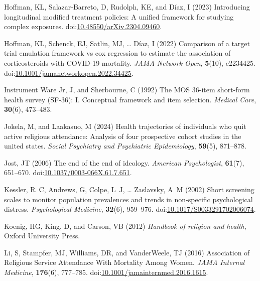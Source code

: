 \documentclass[
  single column]{article}
\newlength{\cslhangindent}
\newenvironment{CSLReferences}[2] %
 {\begin{list}{}{%
  \setlength{\itemindent}{0pt}
  \setlength{\leftmargin}{0pt}
  \setlength{\parsep}{0pt}
  \ifodd #1
   \setlength{\leftmargin}{\cslhangindent}
   \setlength{\itemindent}{-1\cslhangindent}
  \fi
  \setlength{\itemsep}{#2\baselineskip}}}
 {\end{list}}
\begin{document}
\begin{CSLReferences}{1}{0}
Hoffman, KL, Salazar-Barreto, D, Rudolph, KE, and Díaz, I (2023)
Introducing longitudinal modified treatment policies: A unified
framework for studying complex exposures.
doi:\href{https://doi.org/10.48550/arXiv.2304.09460}{10.48550/arXiv.2304.09460}.

Hoffman, KL, Schenck, EJ, Satlin, MJ, \ldots{} Díaz, I (2022) Comparison
of a target trial emulation framework vs cox regression to estimate the
association of corticosteroids with COVID-19 mortality. \emph{JAMA
Network Open}, \textbf{5}(10), e2234425.
doi:\href{https://doi.org/10.1001/jamanetworkopen.2022.34425}{10.1001/jamanetworkopen.2022.34425}.

Instrument Ware Jr, J, and Sherbourne, C (1992) The MOS 36-item
short-form health survey (SF-36): I. Conceptual framework and item
selection. \emph{Medical Care}, \textbf{30}(6), 473--483.

Jokela, M, and Laakasuo, M (2024) Health trajectories of individuals who
quit active religious attendance: Analysis of four prospective cohort
studies in the united states. \emph{Social Psychiatry and Psychiatric
Epidemiology}, \textbf{59}(5), 871--878.

Jost, JT (2006) The end of the end of ideology. \emph{American
Psychologist}, \textbf{61}(7), 651--670.
doi:\href{https://doi.org/10.1037/0003-066X.61.7.651}{10.1037/0003-066X.61.7.651}.

Kessler, R~C, Andrews, G, Colpe, L~J, \ldots{} Zaslavsky, A~M (2002)
Short screening scales to monitor population prevalences and trends in
non-specific psychological distress. \emph{Psychological Medicine},
\textbf{32}(6), 959--976.
doi:\href{https://doi.org/10.1017/S0033291702006074}{10.1017/S0033291702006074}.

Koenig, HG, King, D, and Carson, VB (2012) \emph{Handbook of religion
and health}, Oxford University Press.

Li, S, Stampfer, MJ, Williams, DR, and VanderWeele, TJ (2016)
{Association of Religious Service Attendance With Mortality Among
Women}. \emph{JAMA Internal Medicine}, \textbf{176}(6), 777--785.
doi:\href{https://doi.org/10.1001/jamainternmed.2016.1615}{10.1001/jamainternmed.2016.1615}.


\end{CSLReferences}
\end{document}
